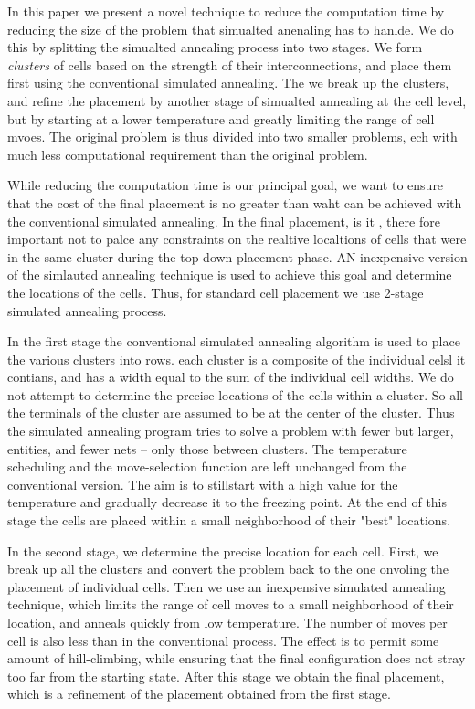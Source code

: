 \documentclass[pdftex,11pt]{article}
\begin{document}
In this paper we present a novel technique to reduce the computation time by reducing the size of the problem that simualted anenaling has to hanlde. We do this by splitting the simualted annealing process into two stages. We form \emph{clusters} of cells based on the strength of their interconnections, and place them first using the conventional simulated annealing. The we break up the clusters, and refine the placement by another stage of simualted annealing at the cell level, but by starting at a lower temperature and greatly limiting the range of cell mvoes. The original problem is thus divided into two smaller problems, ech with much less computational requirement than the original problem.

While reducing the computation time is our principal goal, we want to ensure that the cost of the final placement is no greater than waht can be achieved with the conventional simulated annealing. In the final placement, is it , there fore important not to palce any constraints on the realtive localtions of cells that were in the same cluster during the top-down placement phase. AN inexpensive version of the simlauted annealing technique is used to achieve this goal and determine the locations of the cells. Thus, for standard cell placement we use 2-stage simulated annealing process.

In the first stage the conventional simulated annealing algorithm is used to place the various clusters into rows. each cluster is a composite of the individual celsl it contians, and has a width equal to the sum of the individual cell widths. We do not attempt to determine the precise locations of the cells within a cluster. So all the terminals of the cluster are assumed to be at the center of the cluster. Thus the simulated annealing program tries to solve a problem with fewer but larger, entities, and fewer nets -- only those between clusters. The temperature scheduling and the move-selection function are left unchanged from the conventional version. The aim is to stillstart with a high value for the temperature and gradually decrease it to the freezing point. At the end of this stage the cells are placed within a small neighborhood of their "best" locations.

In the second stage, we determine the precise location for each cell. First, we break up all the clusters and convert the problem back to the one onvoling the placement of individual cells. Then we use an inexpensive simulated annealing technique, which limits the range of cell moves to a small neighborhood of their location, and anneals quickly from low temperature. The number of moves per cell is also less than in the conventional process. The effect is to permit some amount of hill-climbing, while ensuring that the final configuration does not stray too far from the starting state. After this stage we obtain the final placement, which is a refinement of the placement obtained from the first stage.
\end{document}

